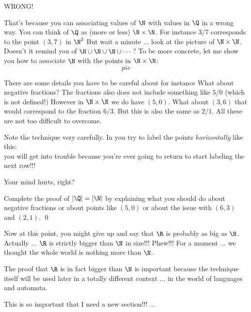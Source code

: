 WRONG!

That's because you can associating values of $\N$ with values in $\Q$
in a wrong way.
You can think of $\Q$ as (more or less) $\N \times \N$.
For instance $3/7$ corresponds to the point $(3, 7)$ in $\N^2$
But wait a minute ... look at the picture of $\N \times \N$.
Doesn't it remind you of $\N \cup \N \cup \N \cup \cdots$?
To be more concrete, let me show you how to associate $\N$ with
the points in $\N \times \N$:
\[
pic
\]

There are some details you have to be careful about for instance
What about negative fractions?
The fractions also does not include something like $5/0$
(which is not defined!)
However in $\N \times \N$ we do have $(5, 0)$.
What about $(3, 6)$ that would correspond to the fraction $6/3$.
But this is also the same as $2/1$.
All these are not too difficult to overcome.

Note the technique very carefully.
In you try to label the points \textit{horizontally} like this:
\[
\]
you will get into trouble because you're ever going to return to 
start labeling the next row!!!

Your mind hurts, right?

\begin{ex}
Complete the proof of $|\Q| = |\N|$ by explaining what you should
do about negative fractions or about points like $(5, 0)$
or about the issue with $(6,3)$ and $(2,1)$.
\qed
\end{ex}

Now at this point, you might give up and say that $\R$ is probably
as big as $\N$.
Actually ... $\R$ is strictly bigger than $\N$ in size!!!
Phew!!! For a moment ... we thought the whole world is nothing more than
$\N$.

The proof that $\R$ is in fact bigger than $\N$ is important 
because the technique itself will be used later in a totally different
context ... in the world of languages and automata.

This is so important that I need a new section!!! ...
